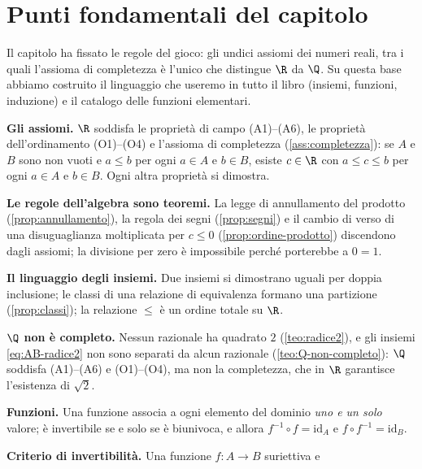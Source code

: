 \section{Punti fondamentali del capitolo}
\label{sec:sintesi-cap01}

Il capitolo ha fissato le regole del gioco: gli undici assiomi dei numeri reali, tra i
quali l'assioma di completezza è l'unico che distingue $\R$ da $\Q$. Su questa base
abbiamo costruito il linguaggio che useremo in tutto il libro (insiemi, funzioni,
induzione) e il catalogo delle funzioni elementari.

\begin{puntichiave}
\item \textbf{Gli assiomi.} $\R$ soddisfa le proprietà di campo (A1)--(A6), le proprietà
dell'ordinamento (O1)--(O4) e l'assioma di completezza (\cref{ass:completezza}): se $A$ e
$B$ sono non vuoti e $a\le b$ per ogni $a\in A$ e $b\in B$, esiste $c\in\R$ con
$a\le c\le b$ per ogni $a\in A$ e $b\in B$. Ogni altra proprietà si dimostra.
\item \textbf{Le regole dell'algebra sono teoremi.} La legge di annullamento del prodotto
(\cref{prop:annullamento}), la regola dei segni (\cref{prop:segni}) e il cambio di verso
di una disuguaglianza moltiplicata per $c\le0$ (\cref{prop:ordine-prodotto}) discendono
dagli assiomi; la divisione per zero è impossibile perché porterebbe a $0=1$.
\item \textbf{Il linguaggio degli insiemi.} Due insiemi si dimostrano uguali per doppia
inclusione; le classi di una relazione di equivalenza formano una partizione
(\cref{prop:classi}); la relazione $\le$ è un ordine totale su $\R$.
\item \textbf{$\Q$ non è completo.} Nessun razionale ha quadrato $2$
(\cref{teo:radice2}), e gli insiemi \eqref{eq:AB-radice2} non sono separati da alcun
razionale (\cref{teo:Q-non-completo}): $\Q$ soddisfa (A1)--(A6) e (O1)--(O4), ma non la
completezza, che in $\R$ garantisce l'esistenza di $\sqrt2$.
\item \textbf{Funzioni.} Una funzione associa a ogni elemento del dominio \emph{uno e un
solo} valore; è invertibile se e solo se è biunivoca, e allora
$f^{-1}\circ f=\mathrm{id}_{A}$ e $f\circ f^{-1}=\mathrm{id}_{B}$.
\item \textbf{Criterio di invertibilità.} Una funzione $f\colon A\to B$ suriettiva e

\end{puntichiave}
